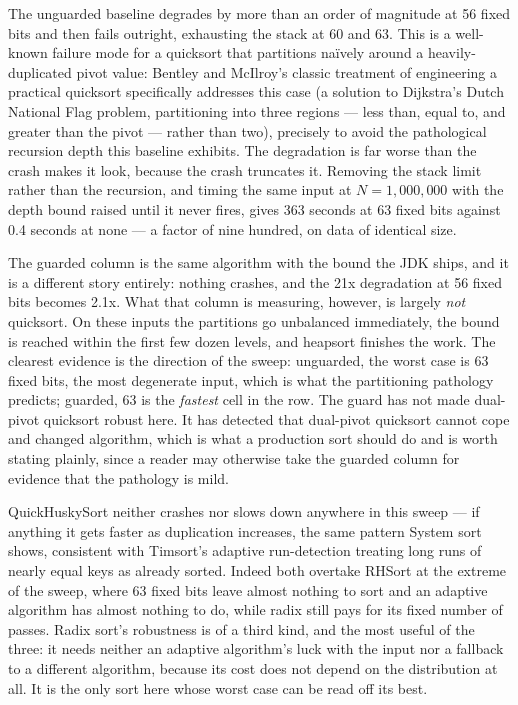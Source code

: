 \documentclass[twoside,leqno,twocolumn]{article}
\begin{document}
The unguarded baseline degrades by more than an order of magnitude at 56 fixed bits and then fails
outright, exhausting the stack at 60 and 63.
This is a well-known failure mode for a quicksort that partitions naïvely around a heavily-duplicated pivot value:
Bentley and McIlroy's classic treatment of engineering a practical quicksort\cite{10.1002/spe.4380231105}
specifically addresses this case (a solution to Dijkstra's Dutch National Flag problem, partitioning into three regions — less than, equal to,
and greater than the pivot — rather than two), precisely to avoid the pathological recursion depth this baseline exhibits.
The degradation is far worse than the crash makes it look, because the crash truncates it.
Removing the stack limit rather than the recursion, and timing the same input at $N=1{,}000{,}000$ with the
depth bound raised until it never fires, gives 363 seconds at 63 fixed bits against 0.4 seconds at none —
a factor of nine hundred, on data of identical size.

The guarded column is the same algorithm with the bound the JDK ships, and it is a different story
entirely: nothing crashes, and the 21x degradation at 56 fixed bits becomes 2.1x.
What that column is measuring, however, is largely \emph{not} quicksort.
On these inputs the partitions go unbalanced immediately, the bound is reached within the first few dozen
levels, and heapsort finishes the work.
The clearest evidence is the direction of the sweep: unguarded, the worst case is 63 fixed bits, the most
degenerate input, which is what the partitioning pathology predicts; guarded, 63 is the \emph{fastest}
cell in the row.
The guard has not made dual-pivot quicksort robust here.
It has detected that dual-pivot quicksort cannot cope and changed algorithm, which is what a
production sort should do and is worth stating plainly, since a reader may otherwise take the guarded
column for evidence that the pathology is mild.

QuickHuskySort neither crashes nor slows down anywhere in this sweep — if anything it gets faster as duplication increases,
the same pattern System sort shows,
consistent with Timsort's adaptive run-detection treating long runs of nearly equal keys as already sorted.
Indeed both overtake RHSort at the extreme of the sweep,
where 63 fixed bits leave almost nothing to sort and an adaptive algorithm has almost nothing to do,
while radix still pays for its fixed number of passes.
Radix sort's robustness is of a third kind, and the most useful of the three:
it needs neither an adaptive algorithm's luck with the input nor a fallback to a different algorithm,
because its cost does not depend on the distribution at all.
It is the only sort here whose worst case can be read off its best.
\end{document}
